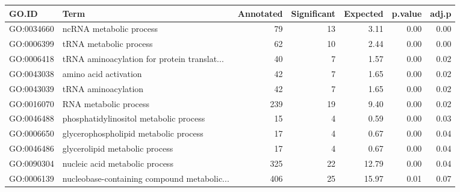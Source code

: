 \begin{table}[ht]
\centering
\begin{tabular}{llrrrrr}
  \hline
GO.ID & Term & Annotated & Significant & Expected & p.value & adj.p \\ 
  \hline
GO:0034660 & ncRNA metabolic process &  79 &  13 & 3.11 & 0.00 & 0.00 \\ 
  GO:0006399 & tRNA metabolic process &  62 &  10 & 2.44 & 0.00 & 0.00 \\ 
  GO:0006418 & tRNA aminoacylation for protein translat... &  40 &   7 & 1.57 & 0.00 & 0.02 \\ 
  GO:0043038 & amino acid activation &  42 &   7 & 1.65 & 0.00 & 0.02 \\ 
  GO:0043039 & tRNA aminoacylation &  42 &   7 & 1.65 & 0.00 & 0.02 \\ 
  GO:0016070 & RNA metabolic process & 239 &  19 & 9.40 & 0.00 & 0.02 \\ 
  GO:0046488 & phosphatidylinositol metabolic process &  15 &   4 & 0.59 & 0.00 & 0.03 \\ 
  GO:0006650 & glycerophospholipid metabolic process &  17 &   4 & 0.67 & 0.00 & 0.04 \\ 
  GO:0046486 & glycerolipid metabolic process &  17 &   4 & 0.67 & 0.00 & 0.04 \\ 
  GO:0090304 & nucleic acid metabolic process & 325 &  22 & 12.79 & 0.00 & 0.04 \\ 
  GO:0006139 & nucleobase-containing compound metabolic... & 406 &  25 & 15.97 & 0.01 & 0.07 \\ 
   \hline
\end{tabular}
\end{table}
